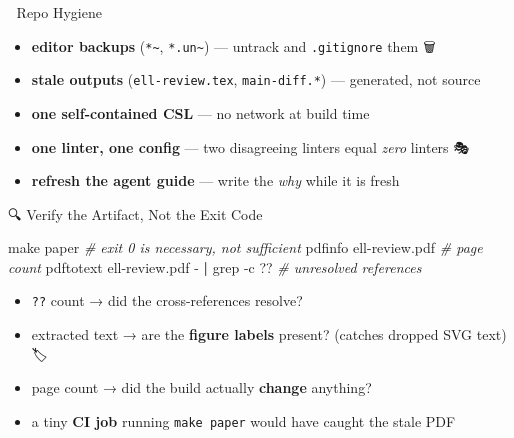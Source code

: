 \documentclass[
  10pt,
  ignorenonframetext,
  serif,
  aspectratio=169]{beamer}
\newenvironment{Shaded}{}{}
\newcommand{\AttributeTok}[1]{\textcolor[rgb]{0.49,0.56,0.16}{#1}}
\newcommand{\CommentTok}[1]{\textcolor[rgb]{0.38,0.63,0.69}{\textit{#1}}}
\newcommand{\ExtensionTok}[1]{#1}
\newcommand{\FunctionTok}[1]{\textcolor[rgb]{0.02,0.16,0.49}{#1}}
\newcommand{\KeywordTok}[1]{\textcolor[rgb]{0.00,0.44,0.13}{\textbf{#1}}}
\newcommand{\NormalTok}[1]{#1}
\newcommand{\StringTok}[1]{\textcolor[rgb]{0.25,0.44,0.63}{#1}}
\providecommand{\tightlist}{%
  \setlength{\itemsep}{0pt}\setlength{\parskip}{0pt}}
\begin{document}
\begin{frame}[fragile]{🧹 Repo Hygiene}
\protect{}\label{repo-hygiene}
\begin{itemize}
\tightlist
\item
  \textbf{editor backups} (\texttt{*\textasciitilde{}},
  \texttt{*.un\textasciitilde{}}) --- untrack and \texttt{.gitignore}
  them 🗑️
\item
  \textbf{stale outputs} (\texttt{ell-review.tex}, \texttt{main-diff.*})
  --- generated, not source 📜
\item
  \textbf{one self-contained CSL} --- no network at build time 📴
\item
  \textbf{one linter, one config} --- two disagreeing linters equal
  \emph{zero} linters 🎭
\item
  \textbf{refresh the agent guide} --- write the \emph{why} while it is
  fresh 🧠
\end{itemize}

\begin{center}
\end{center}
\end{frame}

\begin{frame}[fragile]{🔍 Verify the Artifact, Not the Exit Code}
\protect{}\label{verify-the-artifact-not-the-exit-code}
\begin{Shaded}
\begin{Highlighting}[]
\FunctionTok{make}\NormalTok{ paper                                 }\CommentTok{\# exit 0 is necessary, not sufficient}
\ExtensionTok{pdfinfo}\NormalTok{ ell{-}review.pdf                     }\CommentTok{\# page count}
\ExtensionTok{pdftotext}\NormalTok{ ell{-}review.pdf }\AttributeTok{{-}} \KeywordTok{|} \FunctionTok{grep} \AttributeTok{{-}c} \StringTok{\textquotesingle{}??\textquotesingle{}}  \CommentTok{\# unresolved references}
\end{Highlighting}
\end{Shaded}

\begin{itemize}
\tightlist
\item
  \texttt{??} count → did the cross-references resolve? 🔗
\item
  extracted text → are the \textbf{figure labels} present? (catches
  dropped SVG text) 🏷️
\item
  page count → did the build actually \textbf{change} anything? 📄
\item
  a tiny \textbf{CI job} running \texttt{make\ paper} would have caught
  the stale PDF 🚨
\end{itemize}
\end{frame}
\end{document}
